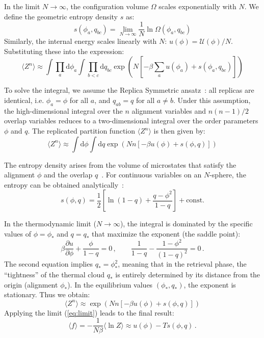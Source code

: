 \documentclass{article}
\newcommand{\dd}{{\mathrm{d}}}
\theoremstyle{plain}
\theoremstyle{definition}
\theoremstyle{remark}
\begin{document}
In the limit $N \to \infty$, the configuration volume $\Omega$ scales exponentially with $N$. We define the geometric entropy density $s$ as:
$$s(\phi_a, q_{bc}) = \lim_{N \to \infty} \frac{1}{N} \ln \Omega(\phi_a, q_{bc})$$
Similarly, the internal energy scales linearly with $N$: $u(\phi) = \mathcal{U}(\phi)/N$. Substituting these into the expression:
\begin{equation}
    \langle Z^n \rangle \approx \int \prod_a \dd \phi_a \int \prod_{b<c}  \dd q_{bc} \exp\left( N \left[ -\beta \sum_a u(\phi_a) + s(\phi_a, q_{bc}) \right] \right)
\end{equation}

To solve the integral, we assume the Replica Symmetric ansatz~\cite{amit1987statistical}: all replicas are identical, i.e. $\phi_a = \phi$ for all $a$, and $q_{ab} = q$ for all $a \neq b$. Under this assumption, the high-dimensional integral over the $n$ alignment variables and $n(n-1)/2$ overlap variables reduces to a two-dimensional integral over the order parameters $\phi$ and $q$. The replicated partition function $\langle Z^n \rangle$ is then given by:
\begin{equation}
\langle Z^n \rangle \approx \int \dd \phi \int \dd q \exp \left( N n \left[ -\beta u(\phi) + s(\phi, q) \right] \right)
\end{equation}

The entropy density arises from the volume of microstates that satisfy the alignment $\phi$ and the overlap $q$~\cite{ea75}. For continuous variables on an $N$-sphere, the entropy can be obtained analytically~\citep[see][for details]{gardner1988space}:
\begin{equation}
    s(\phi, q) = \frac{1}{2} \left[ \ln(1-q) + \frac{q - \phi^2}{1-q} \right] + \text{const.}
\end{equation}

In the thermodynamic limit ($N \to \infty$), the integral is dominated by the specific values of $\phi=\phi_*$ and $q=q_*$ that maximize the exponent (the saddle point):
\begin{equation}
    \beta \frac{\partial u}{\partial \phi} + \frac{\phi}{1-q} = 0\,,\qquad 
    \frac{1}{1-q} - \frac{1-\phi^2}{(1-q)^2} = 0\,.
\end{equation}
The second equation implies $q_* = \phi_*^2$, meaning that in the retrieval phase, the ``tightness'' of the thermal cloud $q_*$ is entirely determined by its distance from the origin (alignment $\phi_*$). In the equilibrium values $(\phi_*, q_*)$, the exponent is stationary. Thus we obtain:
\begin{equation}
    \langle Z^n \rangle \approx \exp\left( N n [-\beta u(\phi) + s(\phi, q)] \right)
\end{equation}
Applying the limit (\ref{eq:limit}) leads to the final result:
\begin{equation}
    \langle f \rangle = -\frac{1}{N\beta} \langle \ln Z \rangle 
    \approx  u(\phi) - T s(\phi, q)\,.
\end{equation}
\end{document}
